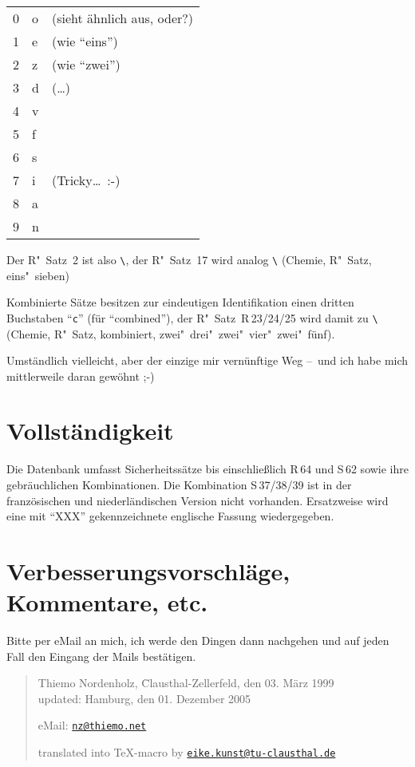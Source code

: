 \documentclass[german, pagesize=auto, fontsize=12pt, headings=normal]{scrartcl}
\makeatletter
\newcommand*{\mail}[1]{\href{mailto:#1}{\texttt{#1}}}
\newcommand*{\cs}[1]{\texttt{\textbackslash#1}}
\newcommand*{\cmd}[1]{\cs{\expandafter\@gobble\string#1}}
\makeatother
\begin{document}
\medskip
\begin{tabular}{@{}l@{$\;\to\;$}>{\ttfamily}ll@{}}
  0 & o & (sieht ähnlich aus, oder?) \\
  1 & e & (wie \enquote{eins})       \\
  2 & z & (wie \enquote{zwei})       \\
  3 & d & (\dots)                    \\
  4 & v &                            \\
  5 & f &                            \\
  6 & s &                            \\
  7 & i & (Tricky\dots\ :-)          \\
  8 & a &                            \\
  9 & n & 
\end{tabular}

\medskip
\noindent
Der R"~Satz~2 ist also \cmd{\crz}, der R"~Satz~17 wird analog \cmd{\crei} (Chemie, R"~Satz,
eins"~sieben)

Kombinierte Sätze besitzen zur eindeutigen Identifikation einen dritten 
Buchstaben \enquote{\texttt{c}} (für \enquote{combined}), der R"~Satz~R\,23/24/25 wird damit zu
\cmd{\crczdzvzf} (Chemie, R"~Satz, kombiniert, zwei"~drei"~zwei"~vier"~zwei"~fünf).

Umständlich vielleicht, aber der einzige mir vernünftige Weg –~und ich
habe mich mittlerweile daran gewöhnt ;-)


\section{Vollständigkeit}

Die Datenbank umfasst Sicherheitssätze bis einschließlich R\,64 und S\,62
sowie ihre gebräuchlichen Kombinationen.
Die Kombination S\,37/38/39 ist in der französischen und niederländischen
Version nicht vorhanden. Ersatzweise wird eine mit \enquote{XXX} gekennzeichnete
englische Fassung wiedergegeben.


\section{Verbesserungsvorschläge, Kommentare, etc.}

Bitte per eMail an mich, ich werde den Dingen dann nachgehen und auf jeden
Fall den Eingang der Mails bestätigen.

\begin{quote}
  \begin{tabbing}
    Thiemo Nordenholz, \= Clausthal-Zellerfeld, den 03. März 1999 \\
    updated:           \> Hamburg, den 01. Dezember 2005
  \end{tabbing}
  eMail: \mail{nz@thiemo.net}

  translated into \TeX-macro by \mail{eike.kunst@tu-clausthal.de}
\end{quote}
\end{document}
